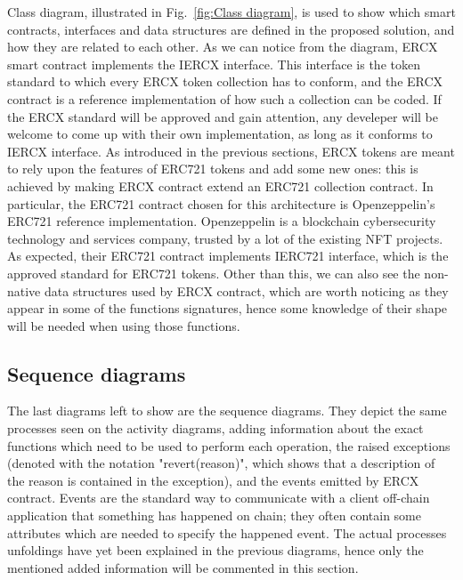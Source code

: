 \documentclass[english, LaM, oneside]{sapthesis}%
\begin{document}
Class diagram, illustrated in Fig.~\ref{fig:Class diagram}, is used to show which smart contracts, interfaces and data structures are defined in the proposed solution, and how they are related to each other. As we can notice from the diagram, ERCX smart contract implements the IERCX interface. This interface is the token standard to which every ERCX token collection has to conform, and the ERCX contract is a reference implementation of how such a collection can be coded. If the ERCX standard will be approved and gain attention, any develeper will be welcome to come up with their own implementation, as long as it conforms to IERCX interface.\newline
As introduced in the previous sections, ERCX tokens are meant to rely upon the features of ERC721 tokens and add some new ones: this is achieved by making ERCX contract extend an ERC721 collection contract. In particular, the ERC721 contract chosen for this architecture is Openzeppelin's\cite{ref:openzeppelin} ERC721 reference implementation. Openzeppelin is a blockchain cybersecurity technology and services company, trusted by a lot of the existing  NFT projects. As expected, their ERC721 contract implements IERC721 interface, which is the approved standard for ERC721 tokens.\newline
Other than this, we can also see the non-native data structures used by ERCX contract, which are worth noticing as they appear in some of the functions signatures, hence some knowledge of their shape will be needed when using those functions.


\subsection{Sequence diagrams}
The last diagrams left to show are the sequence diagrams. They depict the same processes seen on the activity diagrams, adding information about the exact functions which need to be used to perform each operation, the raised exceptions (denoted with the notation "revert(reason)", which shows that a description of the reason is contained in the exception), and the events emitted by ERCX contract. Events are the standard way to communicate with a client off-chain application that something has happened on chain; they often contain some attributes which are needed to specify the happened event. \newline
The actual processes unfoldings have yet been explained in the previous diagrams, hence only the mentioned added information will be commented in this section.
\end{document}
